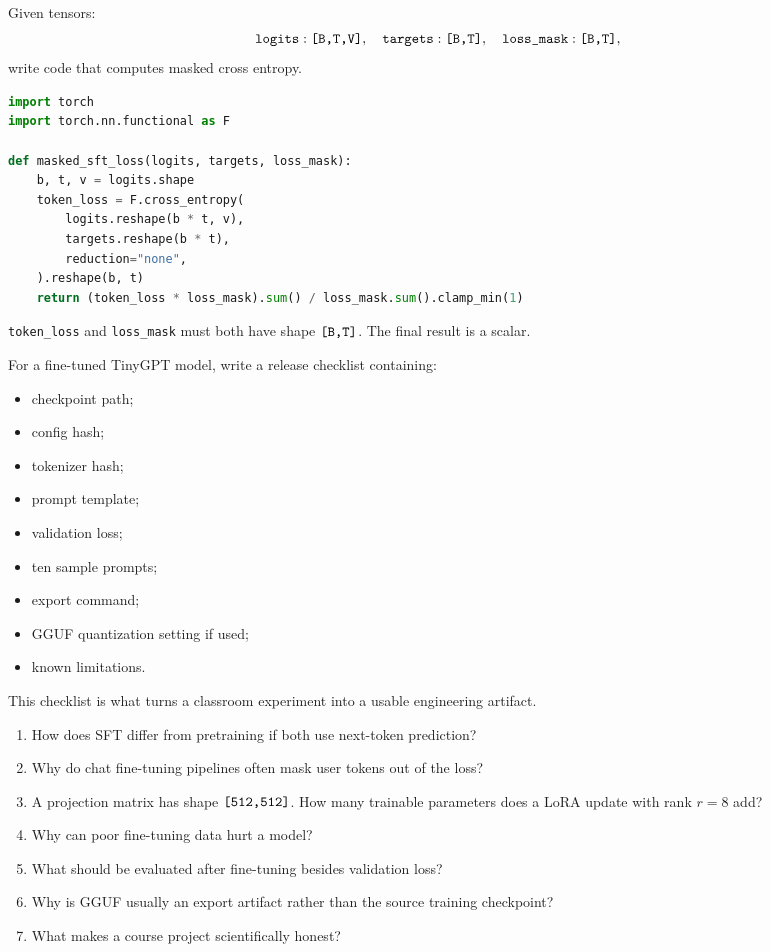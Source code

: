 
Given tensors:
\[
\texttt{logits}: \texttt{[B,T,V]},\quad
\texttt{targets}: \texttt{[B,T]},\quad
\texttt{loss\_mask}: \texttt{[B,T]},
\]
write code that computes masked cross entropy.

\begin{lstlisting}[language=Python]
import torch
import torch.nn.functional as F

def masked_sft_loss(logits, targets, loss_mask):
    b, t, v = logits.shape
    token_loss = F.cross_entropy(
        logits.reshape(b * t, v),
        targets.reshape(b * t),
        reduction="none",
    ).reshape(b, t)
    return (token_loss * loss_mask).sum() / loss_mask.sum().clamp_min(1)
\end{lstlisting}

 \texttt{token\_loss} and \texttt{loss\_mask} must both have shape \(\texttt{[B,T]}\). The final result is a scalar.


For a fine-tuned TinyGPT model, write a release checklist containing:

\begin{itemize}
  \item checkpoint path;
  \item config hash;
  \item tokenizer hash;
  \item prompt template;
  \item validation loss;
  \item ten sample prompts;
  \item export command;
  \item GGUF quantization setting if used;
  \item known limitations.
\end{itemize}

This checklist is what turns a classroom experiment into a usable engineering artifact.

\checkpoint

\begin{enumerate}
  \item How does SFT differ from pretraining if both use next-token prediction?
  \item Why do chat fine-tuning pipelines often mask user tokens out of the loss?
  \item A projection matrix has shape \(\texttt{[512,512]}\). How many trainable parameters does a LoRA update with rank \(r=8\) add?
  \item Why can poor fine-tuning data hurt a model?
  \item What should be evaluated after fine-tuning besides validation loss?
  \item Why is GGUF usually an export artifact rather than the source training checkpoint?
  \item What makes a course project scientifically honest?
\end{enumerate}

